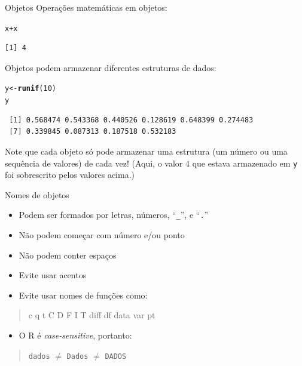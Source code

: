 \documentclass[10pt,handout]{beamer}\usepackage[]{graphicx}\usepackage[]{color}
\makeatletter
\newcommand{\hlnum}[1]{\textcolor[rgb]{0.686,0.059,0.569}{#1}}%
\newcommand{\hlopt}[1]{\textcolor[rgb]{0,0,0}{#1}}%
\newcommand{\hlstd}[1]{\textcolor[rgb]{0.345,0.345,0.345}{#1}}%
\newcommand{\hlkwb}[1]{\textcolor[rgb]{0.69,0.353,0.396}{#1}}%
\newcommand{\hlkwd}[1]{\textcolor[rgb]{0.737,0.353,0.396}{\textbf{#1}}}%
\newenvironment{kframe}{%
 \def\at@end@of@kframe{}%
 \ifinner\ifhmode%
  \def\at@end@of@kframe{\end{minipage}}%
  \begin{minipage}{\columnwidth}%
 \fi\fi%
 \def\FrameCommand##1{\hskip\@totalleftmargin \hskip-\fboxsep
 \colorbox{shadecolor}{##1}\hskip-\fboxsep
     \hskip-\linewidth \hskip-\@totalleftmargin \hskip\columnwidth}%
 \MakeFramed {\advance\hsize-\width
   \@totalleftmargin\z@ \linewidth\hsize
   \@setminipage}}%
 {\par\unskip\endMakeFramed%
 \at@end@of@kframe}
\newenvironment{knitrout}{}{} %
\makeatother
\begin{document}
\begin{frame}[fragile]{Objetos}
Operações matemáticas em objetos:
\begin{knitrout}\small
{}\color{fgcolor}\begin{kframe}
\begin{alltt}
\hlstd{x} \hlopt{+} \hlstd{x}
\end{alltt}
\begin{verbatim}
[1] 4
\end{verbatim}
\end{kframe}
\end{knitrout}
Objetos podem armazenar diferentes estruturas de dados:
\begin{knitrout}\small
{}\color{fgcolor}\begin{kframe}
\begin{alltt}
\hlstd{y} \hlkwb{<-} \hlkwd{runif}\hlstd{(}\hlnum{10}\hlstd{)}
\hlstd{y}
\end{alltt}
\begin{verbatim}
 [1] 0.568474 0.543368 0.440526 0.128619 0.648399 0.274483
 [7] 0.339845 0.087313 0.187518 0.532183
\end{verbatim}
\end{kframe}
\end{knitrout}
Note que cada objeto só pode armazenar uma estrutura (um número ou uma
sequência de valores) de cada vez! (Aqui, o valor $4$ que estava
armazenado em \verb|y| foi sobrescrito pelos valores acima.)
\end{frame}

\begin{frame}[fragile]{Nomes de objetos}
\begin{itemize}
\item Podem ser formados por letras, números, ``\verb|_|'', e
  ``\texttt{.}''
\item Não podem começar com número e/ou ponto
\item Não podem conter espaços
\item Evite usar acentos
\item Evite usar nomes de funções como:
\end{itemize}
\begin{quote}
\begin{center}
\ttfamily \upshape
c q t C D F I T diff df data var pt
\end{center}
\end{quote}
\begin{itemize}
\item O R é \emph{case-sensitive}, portanto:
\end{itemize}
\begin{quote}
\begin{center}
\ttfamily \upshape
\texttt{dados} $\neq$ \texttt{Dados} $\neq$ \texttt{DADOS}
\end{center}
\end{quote}
\end{frame}
\end{document}
